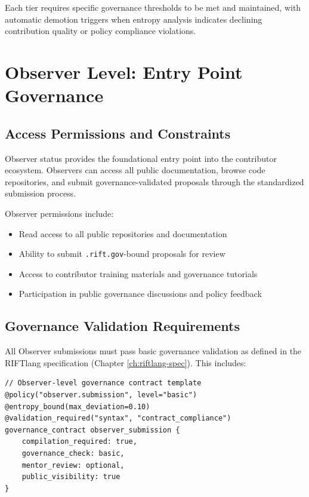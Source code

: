 Each tier requires specific governance thresholds to be met and maintained, with automatic demotion triggers when entropy analysis indicates declining contribution quality or policy compliance violations.

\section{Observer Level: Entry Point Governance}

\subsection{Access Permissions and Constraints}

Observer status provides the foundational entry point into the contributor ecosystem. Observers can access all public documentation, browse code repositories, and submit governance-validated proposals through the standardized submission process.

Observer permissions include:
\begin{itemize}
\item Read access to all public repositories and documentation
\item Ability to submit \texttt{.rift.gov}-bound proposals for review
\item Access to contributor training materials and governance tutorials
\item Participation in public governance discussions and policy feedback
\end{itemize}

\subsection{Governance Validation Requirements}

All Observer submissions must pass basic governance validation as defined in the RIFTlang specification (Chapter \ref{ch:riftlang-spec}). This includes:

\begin{lstlisting}[style=riftlang, language=rift]
// Observer-level governance contract template
@policy("observer.submission", level="basic")
@entropy_bound(max_deviation=0.10)
@validation_required("syntax", "contract_compliance")
governance_contract observer_submission {
    compilation_required: true,
    governance_check: basic,
    mentor_review: optional,
    public_visibility: true
}
\end{lstlisting}

